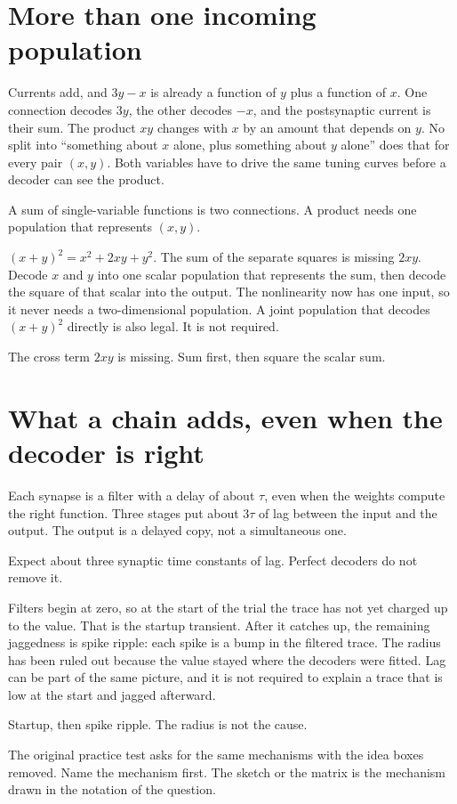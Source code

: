 \documentclass[11pt,letterpaper]{article}
\newcommand{\ans}[1]{\par\vspace{2pt}{\bfseries #1}\quad}
\begin{document}
\section{More than one incoming population}

\ans{1.}
Currents add, and \(3y - x\) is already a function of \(y\) plus a function of \(x\). One connection decodes \(3y\), the other decodes \(-x\), and the postsynaptic current is their sum. The product \(xy\) changes with \(x\) by an amount that depends on \(y\). No split into ``something about \(x\) alone, plus something about \(y\) alone'' does that for every pair \((x, y)\). Both variables have to drive the same tuning curves before a decoder can see the product.
\begin{result}
A sum of single-variable functions is two connections. A product needs one population that represents \((x, y)\).
\end{result}

\ans{2.}
\((x+y)^2 = x^2 + 2xy + y^2\). The sum of the separate squares is missing \(2xy\). Decode \(x\) and \(y\) into one scalar population that represents the sum, then decode the square of that scalar into the output. The nonlinearity now has one input, so it never needs a two-dimensional population. A joint population that decodes \((x+y)^2\) directly is also legal. It is not required.
\begin{result}
The cross term \(2xy\) is missing. Sum first, then square the scalar sum.
\end{result}

\section{What a chain adds, even when the decoder is right}

\ans{1.}
Each synapse is a filter with a delay of about \(\tau\), even when the weights compute the right function. Three stages put about \(3\tau\) of lag between the input and the output. The output is a delayed copy, not a simultaneous one.
\begin{result}
Expect about three synaptic time constants of lag. Perfect decoders do not remove it.
\end{result}

\ans{2.}
Filters begin at zero, so at the start of the trial the trace has not yet charged up to the value. That is the startup transient. After it catches up, the remaining jaggedness is spike ripple: each spike is a bump in the filtered trace. The radius has been ruled out because the value stayed where the decoders were fitted. Lag can be part of the same picture, and it is not required to explain a trace that is low at the start and jagged afterward.
\begin{result}
Startup, then spike ripple. The radius is not the cause.
\end{result}

\vspace{8pt}
The original practice test asks for the same mechanisms with the idea boxes removed. Name the mechanism first. The sketch or the matrix is the mechanism drawn in the notation of the question.
\end{document}

